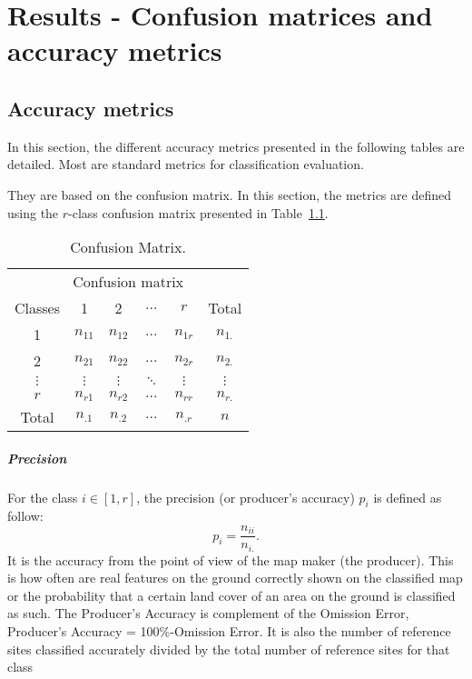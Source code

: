 
\chapter{Results - Confusion matrices and accuracy metrics} %

\label{AppendixC} %

\startcontents[chapters]
\Mprintcontents
\section{Accuracy metrics}
In this section, the different accuracy metrics presented in the following tables are detailed. Most are standard metrics for classification evaluation. 

They are based on the confusion matrix. In this section, the metrics are defined using the $r$-class confusion matrix presented in Table~\ref{table:confusion_ref}.

\begin{table}[htbp]
\begin{center}
\begin{tabular}{c|c c c c| c}

\multicolumn{6}{c}{Confusion matrix} \\

 Classes & 1 & 2 & $\hdots$ & $r$ & Total \\
\hline
1 & $n_{11}$ & $n_{12}$ & $\hdots$ & $n_{1r}$ & $n_{1.}$ \\
2  & $n_{21}$ & $n_{22}$ & $\hdots$ & $n_{2r}$ & $n_{2.}$ \\
$\vdots$  & $\vdots$ & $\vdots$ & $\ddots$ & $\vdots$ & $\vdots$\\
$r$ & $n_{r1}$ & $n_{r2}$ & $\hdots$ & $n_{rr}$ & $n_{r.}$\\
\hline
Total & $n_{.1}$ & $n_{.2}$ & $\hdots$ & $n_{.r}$ & $n$\\
\end{tabular}
\caption{Confusion Matrix.}
\label{table:confusion_ref}
\end{center}
\end{table}


\paragraph{Precision \\}
For the class $i \in [1,r]$, the precision (or producer's accuracy) $p_{i}$ is defined as follow:
\begin{equation}
p_{i}=\frac{n_{ii}}{n_{i.}}.
\end{equation}
It is the accuracy from the point of view of the map maker (the producer). This is how often are real features on the ground correctly shown on the classified map or the probability that a certain land cover of an area on the ground is classified as such. The Producer's Accuracy is complement of the Omission Error, Producer's Accuracy = 100\%-Omission Error. It is also the number of reference sites classified accurately divided by the total number of reference sites for that class

